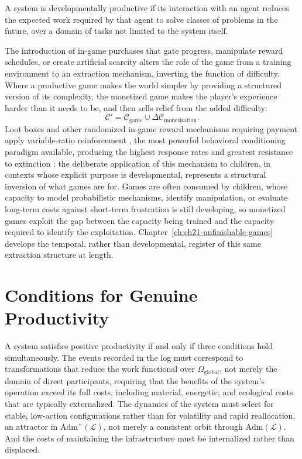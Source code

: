 \begin{definition}
A system is developmentally productive if its interaction with an agent reduces the expected work required by that agent to solve classes of problems in the future, over a domain of tasks not limited to the system itself.
\end{definition}

The introduction of in-game purchases that gate progress, manipulate reward schedules, or create artificial scarcity alters the role of the game from a training environment to an extraction mechanism, inverting the function of difficulty. Where a productive game makes the world simpler by providing a structured version of its complexity, the monetized game makes the player's experience harder than it needs to be, and then sells relief from the added difficulty:
\[
\mathcal{C}' = \mathcal{C}_{\mathrm{game}} \cup \Delta\mathcal{C}_{\mathrm{monetization}}.
\]
Loot boxes and other randomized in-game reward mechanisms requiring payment apply variable-ratio reinforcement \cite{skinner1953}, the most powerful behavioral conditioning paradigm available, producing the highest response rates and greatest resistance to extinction \cite{king2018,king2019,zendle2019,nccreport2022}; the deliberate application of this mechanism to children, in contexts whose explicit purpose is developmental, represents a structural inversion of what games are for. Games are often consumed by children, whose capacity to model probabilistic mechanisms, identify manipulation, or evaluate long-term costs against short-term frustration is still developing, so monetized games exploit the gap between the capacity being trained and the capacity required to identify the exploitation. Chapter~\ref{ch:ch21-unfinishable-games} develops the temporal, rather than developmental, register of this same extraction structure at length.

\section{Conditions for Genuine Productivity}

A system satisfies positive productivity if and only if three conditions hold simultaneously. The events recorded in the log must correspond to transformations that reduce the work functional over $\Omega_{\mathrm{global}}$, not merely the domain of direct participants, requiring that the benefits of the system's operation exceed its full costs, including material, energetic, and ecological costs that are typically externalized. The dynamics of the system must select for stable, low-action configurations rather than for volatility and rapid reallocation, an attractor in $\mathrm{Adm}^+(\mathcal{L})$, not merely a consistent orbit through $\mathrm{Adm}(\mathcal{L})$. And the costs of maintaining the infrastructure must be internalized rather than displaced.


